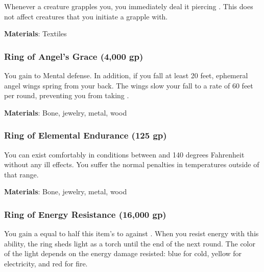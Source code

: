 Whenever a creature grapples you, you immediately deal it piercing .
This does not affect creatures that you initiate a grapple with.



\vspace{0.25em}
\textbf{Materials}: Textiles


\lowercase{\hypertarget{item:Ring of Angel's Grace}{}}\label{item:Ring of Angel's Grace}
\hypertarget{item:Ring of Angel's Grace}{\subsubsection{Ring of Angel's Grace\hfill{} (4,000 gp)}}

You gain   to Mental defense.
In addition, if you fall at least 20 feet, ephemeral angel wings spring from your back.
The wings slow your fall to a rate of 60 feet per round, preventing you from taking .



\vspace{0.25em}
\textbf{Materials}: Bone, jewelry, metal, wood


\lowercase{\hypertarget{item:Ring of Elemental Endurance}{}}\label{item:Ring of Elemental Endurance}
\hypertarget{item:Ring of Elemental Endurance}{\subsubsection{Ring of Elemental Endurance\hfill{} (125 gp)}}

You can exist comfortably in conditions between  and 140 degrees Fahrenheit without any ill effects.
You suffer the normal penalties in temperatures outside of that range.



\vspace{0.25em}
\textbf{Materials}: Bone, jewelry, metal, wood


\lowercase{\hypertarget{item:Ring of Energy Resistance}{}}\label{item:Ring of Energy Resistance}
\hypertarget{item:Ring of Energy Resistance}{\subsubsection{Ring of Energy Resistance\hfill{} (16,000 gp)}}

You gain a  equal to half this item's  to  against .
When you resist energy with this ability, the ring sheds light as a torch until the end of the next round.
The color of the light depends on the energy damage resisted: blue for cold, yellow for electricity, and red for fire.



